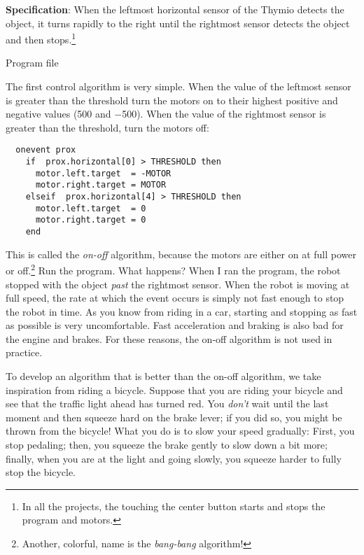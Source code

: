 
\textbf{Specification}: When the leftmost horizontal sensor of the
Thymio detects the object, it turns rapidly to the right until the
rightmost sensor detects the object and then stops.\footnote{In all
the projects, the touching the center button starts and stops the
program and motors.}

{\raggedleft \hfill Program file }

The first control algorithm is very simple. When the value of the
leftmost sensor is greater than the threshold turn the motors
on to their highest positive and negative values (500 and $-$500). When
the value of the rightmost sensor is greater than the threshold, turn
the motors off:

\begin{verbatim}
  onevent prox
    if  prox.horizontal[0] > THRESHOLD then
      motor.left.target  = -MOTOR 
      motor.right.target = MOTOR
    elseif  prox.horizontal[4] > THRESHOLD then
      motor.left.target  = 0
      motor.right.target = 0
    end
\end{verbatim}

This is called the \emph{on-off} algorithm, because the motors are
either on at full power or off.\footnote{Another, colorful, name is the
\emph{bang-bang} algorithm!} Run the program. What happens? When I ran
the program, the robot stopped with the object \emph{past} the
rightmost sensor. When the robot is moving at full speed, the rate at
which the  event occurs is simply not fast enough to stop the
robot in time. As you know from riding in a car, starting and stopping
as fast as possible is very uncomfortable. Fast acceleration and braking
is also bad for the engine and brakes. For these reasons, the on-off
algorithm is not used in practice.


To develop an algorithm that is better than the on-off algorithm, we
take inspiration from riding a bicycle. Suppose that you are riding your
bicycle and see that the traffic light ahead has turned red. You
\emph{don't} wait until the last moment and then squeeze hard on the
brake lever; if you did so, you might be thrown from the bicycle! What
you do is to slow your speed gradually: First, you stop pedaling; then,
you squeeze the brake gently to slow down a bit more; finally, when you
are at the light and going slowly, you squeeze harder to fully stop the
bicycle.

